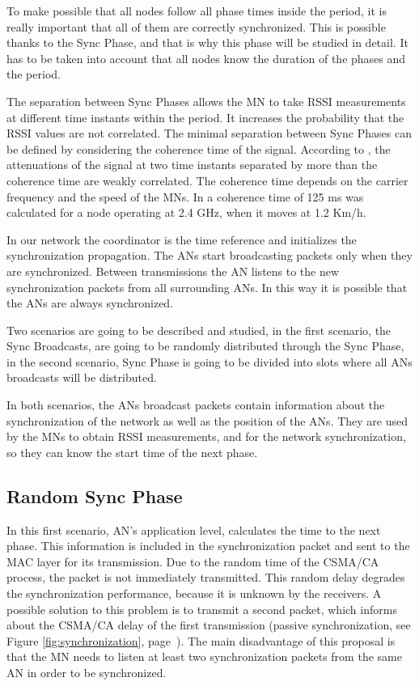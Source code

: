 To make possible that all nodes follow all phase times inside the period, it is really important that all of them are correctly synchronized. This is 
possible thanks to the Sync Phase, and that is why this phase will be studied in detail. It has to be taken into account that all nodes know the duration
of the phases and the period.

The separation between Sync Phases allows the \ac{MN} to take \ac{RSSI} measurements at different time instants within the period. It increases the 
probability that the \ac{RSSI} values are not correlated. The minimal separation between Sync Phases can be defined by considering the coherence time 
of the signal.  According to \cite{RSSIcorrelated}, the attenuations of the signal at two time instants separated by more than the coherence time 
are weakly correlated. The coherence time depends on the carrier frequency and the speed of the \acp{MN}. In \cite{RSSIcorrelated2} a coherence time 
of 125 ms was calculated for a node operating at 2.4 GHz, when it moves at 1.2 Km/h.

In our network the coordinator is the time reference and initializes the synchronization propagation. The \acp{AN} start broadcasting packets only 
when they are synchronized. Between transmissions the \ac{AN} listens to the new synchronization packets from all surrounding \acp{AN}. In this way 
it is possible that the \acp{AN} are always synchronized.

Two scenarios are going to be described and studied, in the first scenario, the Sync Broadcasts, are going to be randomly distributed through the Sync 
Phase, in the second scenario, Sync Phase is going to be divided into slots where all \acp{AN} broadcasts will be distributed.

In both scenarios, the \acp{AN} broadcast packets contain information about the synchronization of the network as well as the position 
of the \acp{AN}. They are used by the \acp{MN} to obtain \ac{RSSI} measurements, and for the network synchronization, so they can know the start time of 
the next phase.

\subsection{Random Sync Phase}

In this first scenario, \ac{AN}'s application level, calculates the time to the next phase. This information is included in the synchronization packet 
and sent to the \ac{MAC} layer for its transmission. Due to the random time of the \ac{CSMA/CA} process, the packet is not immediately transmitted. This 
random delay degrades the synchronization performance, because it is unknown by the receivers. A possible solution to this problem is to transmit a 
second packet, which informs about the \ac{CSMA/CA} delay of the first transmission (passive synchronization, see Figure \ref{fig:synchronization}, 
page~\pageref{fig:synchronization}). The main disadvantage of this proposal is that the \ac{MN} needs to listen at least two synchronization packets 
from the same \ac{AN} in order to be synchronized.

